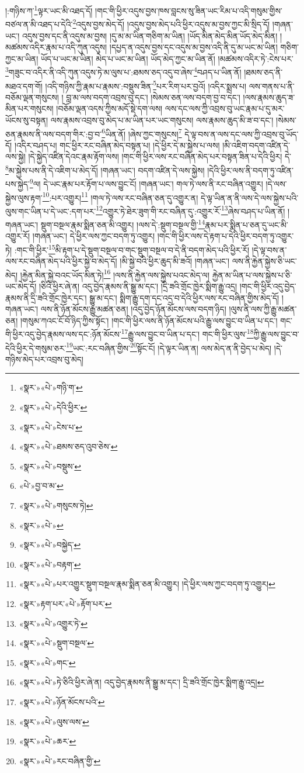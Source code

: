 །:གཉིས་ཀ་\footnote{«སྣར་»«པེ་»གཉི་ག་}ལྟར་ཡང་མི་འཐད་དོ། །གང་གི་ཕྱིར་འདུས་བྱས་ཁས་བླངས་སུ་ཟིན་ཡང་རིམ་པ་འདི་གསུམ་གྱིས་བཙལ་ན་མི་འཐད་པ་དེའི་\footnote{«སྣར་»«པེ་»དེའི་ཕྱིར་}འདུས་བྱས་མེད་དོ། །འདུས་བྱས་མེད་པའི་ཕྱིར་འདུས་མ་བྱས་ཀྱང་མི་སྲིད་དོ། །གཞན་ཡང་། འདུས་བྱས་དང་ནི་འདུས་མ་བྱས། །དུ་མ་མ་ཡིན་གཅིག་མ་ཡིན། །ཡོད་མིན་མེད་མིན་ཡོད་མེད་མིན། །མཚམས་འདིར་རྣམ་པ་འདི་ཀུན་འདུས། །དཔྱད་ན་འདུས་བྱས་དང་འདུས་མ་བྱས་འདི་ནི་དུ་མ་ཡང་མ་ཡིན། གཅིག་ཀྱང་མ་ཡིན། ཡོད་པ་ཡང་མ་ཡིན། མེད་པ་ཡང་མ་ཡིན། ཡོད་མེད་ཀྱང་མ་ཡིན་ནོ། །མཚམས་འདིར་ཏེ་:ངེས་པར་\footnote{«སྣར་»«པེ་»ངེས་པ་}གཟུང་བ་འདིར་ནི་འདི་ཀུན་འདུས་ཏེ་མ་ལུས་པ་:ཐམས་ཅད་འདུ་བ་ཞེས་\footnote{«སྣར་»«པེ་»ཐམས་ཅད་འུབ་ཅེས་}བཤད་པ་ཡིན་ནོ། །ཐམས་ཅད་ནི་མཐའ་དག་གོ། །འདི་གཉིས་ཀྱི་རྣམ་པ་རྣམས་:བསྡུས་ཟིན་\footnote{«སྣར་»«པེ་»བསྡུས་}པར་རིག་པར་བྱའོ། །འདིར་སྨྲས་པ། ལས་གནས་པ་ནི་བཅོམ་ལྡན་གསུངས། །
བླ་མ་ལས་བདག་འབྲས་བུ་དང་། །སེམས་ཅན་ལས་བདག་བྱ་བ་དང་། །ལས་རྣམས་ཆུད་ཟ་མིན་པར་གསུངས། །བཅོམ་ལྡན་འདས་ཀྱིས་མདོ་སྡེ་དག་ལས། ལས་དང་ལས་ཀྱི་འབྲས་བུ་ཡང་རྣམ་པ་དུ་མར་ཡོངས་སུ་བསྟན། ལས་རྣམས་འབྲས་བུ་མེད་པ་མ་ཡིན་པར་ཡང་གསུངས། ལས་རྣམས་ཆུད་མི་ཟ་བ་དང་། །སེམས་ཅན་རྣམས་ནི་ལས་བདག་གིར་:བྱ་བ་\footnote{«པེ་»བྱ་བ་མ་}ཡིན་ནོ། །ཞེས་ཀྱང་གསུངས།\footnote{«སྣར་»«པེ་»གསུངས་ཏེ།} དེ་ལྟ་བས་ན་ལས་དང་ལས་ཀྱི་འབྲས་བུ་ཡོད་དོ། །འདིར་བཤད་པ། གང་ཕྱིར་རང་བཞིན་མེད་བསྟན་པ། །དེ་ཕྱིར་དེ་མ་སྐྱེས་པ་ལས། །མི་འཇིག་བདག་འཛིན་དེ་ལས་སྐྱེ། །དེ་སྐྱེད་འཛིན་དེའང་རྣམ་རྟོག་ལས། །གང་གི་ཕྱིར་ལས་རང་བཞིན་མེད་པར་བསྟན་ཟིན་པ་དེའི་ཕྱིར། དེ་\footnote{«སྣར་»«པེ་»}མ་སྐྱེས་པས་ནི་དེ་འཇིག་པ་མེད་དོ། །གཞན་ཡང་། བདག་འཛིན་དེ་ལས་སྐྱེས། །དེའི་ཕྱིར་ལས་ནི་བདག་ཏུ་འཛིན་པས་སྐྱེད་\footnote{«སྣར་»«པེ་»བསྐྱེད་}ལ། དེ་ཡང་རྣམ་པར་རྟོག་པ་ལས་བྱུང་ངོ། །གཞན་ཡང་། གལ་ཏེ་ལས་ནི་རང་བཞིན་འགྱུར། །དེ་ལས་སྐྱེས་ལུས་རྟག་\footnote{«སྣར་»«པེ་»བརྟག་}:པར་འགྱུར།\footnote{«སྣར་»«པེ་»པར་འགྱུར་སྡུག་བསྔལ་རྣམ་སྨིན་ཅན་མི་འགྱུར། །དེ་ཕྱིར་ལས་ཀྱང་བདག་ཏུ་འགྱུར།} །གལ་ཏེ་ལས་རང་བཞིན་ཅན་དུ་འགྱུར་ན། དེ་ལྟ་ཡིན་ན་ནི་ལས་དེ་ལས་སྐྱེས་པའི་ལུས་གང་ཡིན་པ་དེ་ཡང་:དག་པར་\footnote{«སྣར་»རྟག་པར་«པེ་»རྟོག་པར་}འགྱུར་ཏེ་ཐེར་ཟུག་གི་རང་བཞིན་དུ་:འགྱུར་རོ་\footnote{«སྣར་»«པེ་»འགྱུར་ཏེ་}ཞེས་བཤད་པ་ཡིན་ནོ། །གཞན་ཡང་། སྡུག་བསྔལ་རྣམ་སྨིན་ཅན་མི་འགྱུར། །ལས་དེ་:སྡུག་བསྔལ་གྱི་\footnote{«སྣར་»«པེ་»སྡུག་བསྔལ་}རྣམ་པར་སྨིན་པ་ཅན་དུ་ཡང་མི་འགྱུར་རོ། །གཞན་ཡང་། དེ་ཕྱིར་ལས་ཀྱང་བདག་ཏུ་འགྱུར། །གང་གི་ཕྱིར་ལས་དེ་རྟག་པ་དེའི་ཕྱིར་བདག་ཏུ་འགྱུར་ཏེ། :གང་གི་ཕྱིར་\footnote{«སྣར་»«པེ་»གང་}མི་རྟག་པ་དེ་སྡུག་བསྔལ་བ་གང་སྡུག་བསྔལ་བ་དེ་ནི་བདག་མེད་པའི་ཕྱིར་རོ། །དེ་ལྟ་བས་ན་ལས་རང་བཞིན་མེད་པའི་ཕྱིར་སྐྱེ་བ་མེད་དོ། །མི་སྐྱེ་བའི་ཕྱིར་ཆུད་མི་ཟའོ། །གཞན་ཡང་། ལས་ནི་རྐྱེན་སྐྱེས་ཅི་ཡང་མེད། །རྐྱེན་མིན་སྐྱེ་བའང་ཡོད་མིན་ཏེ།\footnote{«སྣར་»«པེ་»ཏེ་ཅིའི་ཕྱིར་ཞེ་ན། འདུ་བྱེད་རྣམས་ནི་སྒྱུ་མ་དང་། དྲི་ཟའི་གྲོང་ཁྱེར་སྨིག་རྒྱུ་འདྲ།} །ལས་ནི་རྐྱེན་ལས་སྐྱེས་པའང་མེད་ལ། རྐྱེན་མ་ཡིན་པ་ལས་སྐྱེས་པ་ཅི་ཡང་མེད་དོ། །ཅིའི་ཕྱིར་ཞེ་ན། འདུ་བྱེད་རྣམས་ནི་སྒྱུ་མ་དང་། །དྲི་ཟའི་གྲོང་ཁྱེར་སྨིག་རྒྱུ་འདྲ། །གང་གི་ཕྱིར་འདུ་བྱེད་རྣམས་ནི་དྲི་ཟའི་གྲོང་ཁྱེར་དང་། སྒྱུ་མ་དང་། སྨིག་རྒྱུ་དག་དང་འདྲ་བ་དེའི་ཕྱིར་ལས་རང་བཞིན་གྱིས་མེད་དོ། །གཞན་ཡང་། ལས་ནི་ཉོན་མོངས་རྒྱུ་མཚན་ཅན། །འདུ་བྱེད་ཉོན་མོངས་ལས་བདག་ཉིད། །ལུས་ནི་ལས་ཀྱི་རྒྱུ་མཚན་ཅན། །གསུམ་ཀའང་ངོ་བོ་ཉིད་ཀྱིས་སྟོང་། །གང་གི་ཕྱིར་ལས་ནི་ཉོན་མོངས་པའི་རྒྱུ་ལས་བྱུང་བ་ཡིན་པ་དང་། གང་གི་ཕྱིར་འདུ་བྱེད་རྣམས་ལས་དང་:ཉོན་མོངས་\footnote{«སྣར་»«པེ་»ཉོན་མོངས་པའི་}རྒྱུ་ལས་བྱུང་བ་ཡིན་པ་དང་། གང་གི་ཕྱིར་ལུས་\footnote{«སྣར་»«པེ་»ལུས་ལས་}ཀྱི་རྒྱུ་ལས་བྱུང་བ་དེའི་ཕྱིར་དེ་གསུམ་ཅར་\footnote{«སྣར་»«པེ་»ཆར་}ཡང་:རང་བཞིན་གྱིས་\footnote{«སྣར་»«པེ་»རང་བཞིན་གྱི་}སྟོང་ངོ། །དེ་ལྟར་ཡིན་ན། ལས་མེད་ན་ནི་བྱེད་པ་མེད། །དེ་གཉིས་མེད་པར་འབྲས་བུ་མེད། 
